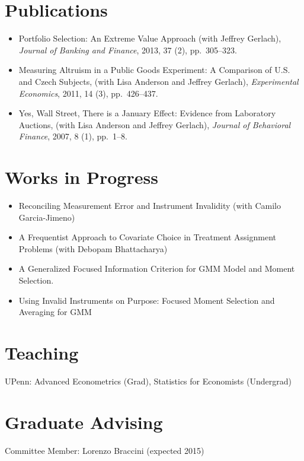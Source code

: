 \documentclass[11pt,line,overlapped,letterpaper]{myres}
\begin{document}
\begin{resume}

\section{\sc Publications}
\begin{itemize}
	\item Portfolio Selection: An Extreme Value Approach (with Jeffrey Gerlach), \emph{Journal of Banking and Finance}, 2013, 37 (2), pp.\ 305--323.
	\item Measuring Altruism in a Public Goods Experiment:  A Comparison of U.S. and Czech Subjects, (with Lisa Anderson and Jeffrey Gerlach), \emph{Experimental Economics}, 2011, 14 (3), pp.\ 426--437.
	\item Yes, Wall Street, There is a January Effect: Evidence from Laboratory Auctions, (with Lisa Anderson and Jeffrey Gerlach), \emph{Journal of Behavioral Finance}, 2007, 8 (1), pp.\ 1--8. 
\end{itemize}






\section{\sc Works in Progress}
\begin{itemize}
	\item Reconciling Measurement Error and Instrument Invalidity (with Camilo Garcia-Jimeno)
	\item A Frequentist Approach to Covariate Choice in Treatment Assignment Problems (with Debopam Bhattacharya)
	\item A Generalized Focused Information Criterion for GMM Model and Moment Selection.
	\item Using Invalid Instruments on Purpose: Focused Moment Selection and Averaging for GMM

\end{itemize}




\section{\sc Teaching }
\vspace{0.5em}
	UPenn: Advanced Econometrics (Grad), Statistics for Economists (Undergrad)
	


\section{\sc Graduate Advising}
\vspace{0.5em}
Committee Member: Lorenzo Braccini (expected 2015)



\end{resume}
\end{document}

